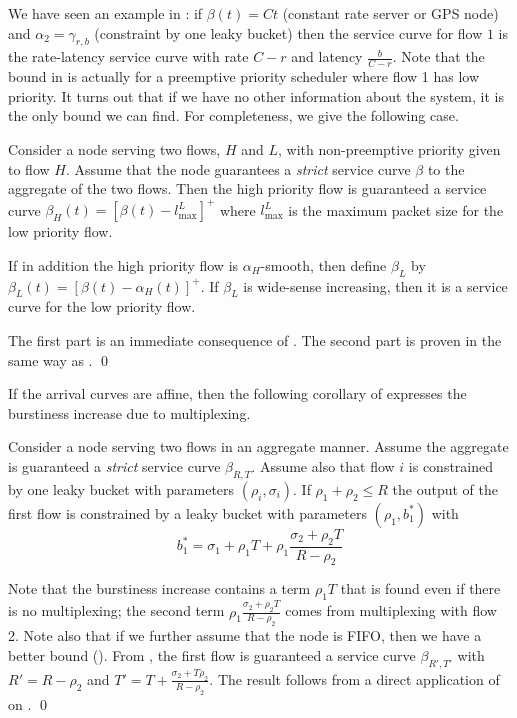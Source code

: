 We have seen an example in : if $\beta(t)=Ct$
(constant rate server or GPS node) and $\alpha_2= \gamma_{r,b}$
(constraint by one leaky bucket) then the service curve for flow
$1$ is the rate-latency service curve with rate $C-r$ and latency
$\frac{b}{C-r}$. Note that the bound in  is
actually for a preemptive priority scheduler where flow 1 has low
priority. It turns out that if we have no other information about
the system, it is the only bound we can find. For completeness, we
give the following case.

\begin{corollary}
Consider a node serving two flows, $H$ and $L$, with
non-preemptive priority given to flow $H$. Assume that the node
guarantees a \emph{strict} service curve $\beta$ to the aggregate
of the two flows. Then the high priority flow is guaranteed a
service curve $\beta_H(t)=[\beta(t) - l^L_{\max}]^+$ where
$l^L_{\max}$ is the maximum packet size for the low priority flow.

If in addition the high priority flow is $\alpha_H$-smooth, then
define $\beta_L$ by $\beta_L(t)=[\beta(t) - \alpha_H(t)]^+$. If
$\beta_L$ is wide-sense increasing, then it is a service curve for
the low priority flow.
 \end{corollary}
 \pr
 The first part is an immediate consequence of
 . The second part is proven in the same way
 as . \qed

If the arrival curves are affine, then the following corollary of
 expresses the burstiness increase due to
multiplexing.
\begin{corollary}
Consider a node serving two flows in an aggregate manner. Assume
the aggregate is guaranteed a \emph{strict} service curve
$\beta_{R,T}$. Assume also that flow $i$ is constrained by one
leaky bucket with parameters $(\rho_i,\sigma_i)$. If $\rho_1 +
\rho_2 \leq R$ the output of the first flow is constrained by a
leaky bucket with parameters $(\rho_1, b^*_1)$ with
$$
b^*_1 = \sigma_1 +\rho_1 T +\rho_1 \frac{\sigma_2+ \rho_2
T}{R-\rho_2}
$$
\end{corollary}
Note that the burstiness increase contains a term $\rho_1 T$ that
is found even if there is no multiplexing; the second term $\rho_1
\frac{\sigma_2+ \rho_2 T}{R-\rho_2}$ comes from multiplexing with
flow 2. Note also that if we further assume that the node is FIFO,
then we have a better bound ().
\pr
From , the first flow is guaranteed a service
curve $\beta_{R', T'}$ with $R'=R-\rho_2$ and $T'= T+\frac{\sigma_2
+T \rho_2}{R-\rho_2}$. The result follows from a direct
application of  on . \qed

